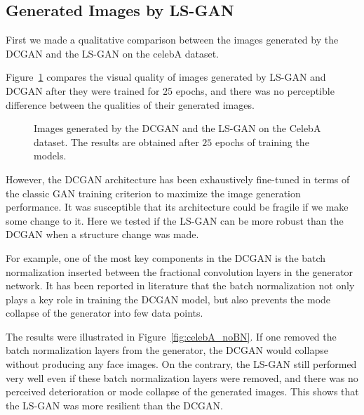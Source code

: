 \documentclass[11pt,fullpage, letterpaper,twoside]{article}
\newcommand{\1}[1]{\mathds{1}_{\left[#1\right]}}
\begin{document}
\subsection{Generated Images by LS-GAN}

First we made a qualitative comparison between the images generated by the DCGAN and the LS-GAN on the celebA dataset.

Figure~\ref{fig:celebA} compares the visual quality of images generated by LS-GAN and DCGAN after they were trained for $25$ epochs, and
there was no perceptible difference between the qualities of their generated images.

\begin{figure}[t!]
\centering
{}
\caption{Images generated by the DCGAN and the LS-GAN on the CelebA dataset. The results are obtained after $25$ epochs of training the models.}\label{fig:celebA}
\end{figure}

However, the DCGAN architecture has been exhaustively fine-tuned in terms of the classic GAN training criterion to maximize the image generation performance. It was susceptible that its architecture could be fragile if we make some change to it. Here we tested if the LS-GAN can be more robust than the DCGAN when a structure change was made.

For example, one of the most key components in the DCGAN is the batch normalization inserted between the fractional convolution layers in the generator network. It has been reported in literature \cite{salimans2016improved} that the batch normalization not only plays a key role in training the DCGAN model, but also prevents the mode collapse of the generator into few data points.

The results were illustrated in Figure~\ref{fig:celebA_noBN}. If one removed the batch normalization layers from the generator, the DCGAN would collapse without producing any face images.  On the contrary, the LS-GAN still performed very well even if these batch normalization layers were removed, and there was { no perceived deterioration or mode collapse of the generated images}. This shows that the LS-GAN was more resilient than the DCGAN.
\end{document}
